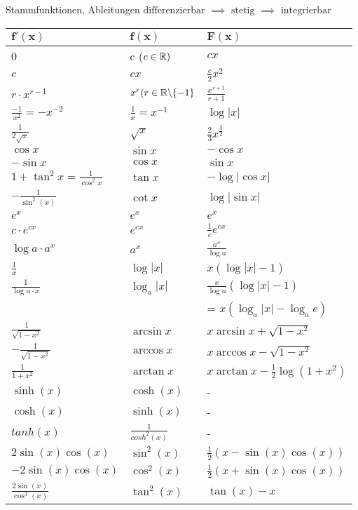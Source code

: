 \begin{Rechenregeln}{Stammfunktionen, Ableitungen}{}
    $\text{differenzierbar }\implies\text{ stetig }\implies \text{ integrierbar}$\\
    \begin{tabular}{l|l|l}
    $\mathbf{f'(x)}$ & $\mathbf{f(x)}$ & $\mathbf{F(x)}$ \\[0.5em] \hline
    0 & c ($c\in\mathbb{R})$ & $cx$ \\[0.5em]
    $c$ & $cx$ &$\frac{c}{2}x^2$ \\[0.5em]
    $r\cdot x^{r-1}$ & $x^r (r\in \mathbb{R} \backslash \{-1\}$ & $\frac{x^{r+1}}{r+1}$ \\[0.5em]
    $\frac{-1}{x^2} = -x^{-2}$ & $\frac{1}{x}=x^{-1}$ & $\log |x| $ \\[0.5em]
    $\frac{1}{2 \sqrt{x}} $ & $\sqrt{x}$ & $\frac{2}{3}x^{\frac{3}{2}}$ \\[0.5em]
    $\cos x$ & $\sin x$  & $-\cos x$ \\[0.5em]
    $-\sin x$ & $\cos x$ & $\sin x$\\[0.5em]
    $1+\tan^2x = \frac{1}{\cos^2x}$ & $\tan x$ & $-\log|\cos x|$\\[0.5em]
    $-\frac{1}{\sin^2(x)}$ & $\cot x$ & $\log|\sin x|$\\[0.5em]
    $e^x$ & $e^x$ & $e^x$\\[0.5em]
    $c\cdot e^{cx}$ & $e^{cx}$ & $\frac{1}{c}e^{cx}$\\[0.5em]
    $\log a \cdot a^x$ & $a^x$ & $\frac{a^x}{\log a}$\\[0.5em]
    $\frac{1}{x}$ & $\log|x|$ & $x(\log|x|-1)$ \\[0.5em]
    $\frac{1}{\log a\cdot x}$ & $\log_a |x|$ & $\frac{x}{\log a}(\log|x|-1)$\\[0.5em]
     & & = $x(\log_a|x|-\log_ae)$\\[0.5em]
    $\frac{1}{\sqrt{1-x^2}}$ & $\arcsin x$ & $x\arcsin x + \sqrt{1-x^2}$\\[0.5em]
    $-\frac{1}{\sqrt{1-x^2}}$ & $\arccos x$ &  $x\arccos x - \sqrt{1-x^2}$\\[0.5em]
    $\frac{1}{1+x^2}$ & $\arctan x$ & $x\arctan x - \frac{1}{2}\log(1+x^2)$\\[0.5em]
    $\sinh(x)$ & $\cosh(x)$ & - \\[0.5em]
    $\cosh(x)$ & $\sinh(x)$ & -\\[0.5em]
    $tanh(x)$ & $\frac{1}{cosh^2(x)}$ & -\\[1em]
    $2 \sin(x)\cos(x)$ & $\sin^2(x)$ & $\frac{1}{2}(x-\sin(x)\cos(x))$ \\[.5em]
    $-2\sin(x)\cos(x)$ & $\cos^2(x)$ & $\frac{1}{2}(x+\sin(x)\cos(x))$ \\[.5em]
    $\frac{2 \sin(x)}{\cos^3(x)}$ & $\tan^2(x)$ & $\tan(x) - x$\\[.5em]
    \end{tabular}
\end{Rechenregeln}
